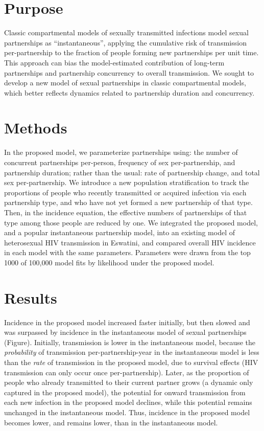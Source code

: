 \section{Purpose}
Classic compartmental models of sexually transmitted infections
model sexual partnerships as ``instantaneous'',
applying the cumulative risk of transmission per-partnership
to the fraction of people forming new partnerships per unit time.
This approach can bias the model-estimated contribution of
long-term partnerships and partnership concurrency to overall transmission.
We sought to develop a new model of sexual partnerships in classic compartmental models,
which better reflects dynamics related to partnership duration and concurrency.
\section{Methods}
In the proposed model, we parameterize partnerships using:
the number of concurrent partnerships per-person, frequency of sex per-partnership, and partnership duration;
rather than the usual: rate of partnership change, and total sex per-partnership.
We introduce a new population stratification to track the proportions of people
who recently transmitted or acquired infection via each partnership type,
and who have not yet formed a new partnership of that type.
Then, in the incidence equation, the effective numbers of
partnerships of that type among those people are reduced by one.
We integrated the proposed model, and a popular instantaneous partnership model,
into an existing model of heterosexual HIV transmission in Eswatini,
and compared overall HIV incidence in each model with the same parameters.
Parameters were drawn from the top 1000 of 100,000 model fits by likelihood under the proposed model.
\section{Results}
Incidence in the proposed model increased faster initially, but then slowed and was surpassed by
incidence in the instantaneous model of sexual partnerships (Figure).
Initially, transmission is lower in the instantaneous model,
because the \emph{probability} of transmission per-partnership-year in the instantaneous model
is less than the \emph{rate} of transmission in the proposed model,
due to survival effects (HIV transmission can only occur once per-partnership).
Later, as the proportion of people who already transmitted to their current partner grows
(a dynamic only captured in the proposed model),
the potential for onward transmission from each new infection in the proposed model declines,
while this potential remains unchanged in the instantaneous model.
Thus, incidence in the proposed model becomes lower, and remains lower,
than in the instantaneous model.
